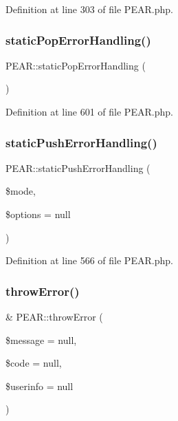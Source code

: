 Definition at line 303 of file P\+E\+A\+R.\+php.

\mbox{\label{classPEAR_ad558eaf2cadc1eb2afa180f7a75bcab3}} 
\subsubsection{\texorpdfstring{static\+Pop\+Error\+Handling()}{staticPopErrorHandling()}}
{\footnotesize\ttfamily P\+E\+A\+R\+::static\+Pop\+Error\+Handling (\begin{DoxyParamCaption}{ }\end{DoxyParamCaption})}



Definition at line 601 of file P\+E\+A\+R.\+php.

\mbox{\label{classPEAR_a5bfc268ba255bb88c2f98bb5f9f0a124}} 
\subsubsection{\texorpdfstring{static\+Push\+Error\+Handling()}{staticPushErrorHandling()}}
{\footnotesize\ttfamily P\+E\+A\+R\+::static\+Push\+Error\+Handling (\begin{DoxyParamCaption}\item[{}]{\$mode,  }\item[{}]{\$options = {\ttfamily null} }\end{DoxyParamCaption})}



Definition at line 566 of file P\+E\+A\+R.\+php.

\mbox{\label{classPEAR_a146f08ee812450913835040d43b2c832}} 
\subsubsection{\texorpdfstring{throw\+Error()}{throwError()}}
{\footnotesize\ttfamily \& P\+E\+A\+R\+::throw\+Error (\begin{DoxyParamCaption}\item[{}]{\$message = {\ttfamily null},  }\item[{}]{\$code = {\ttfamily null},  }\item[{}]{\$userinfo = {\ttfamily null} }\end{DoxyParamCaption})}

